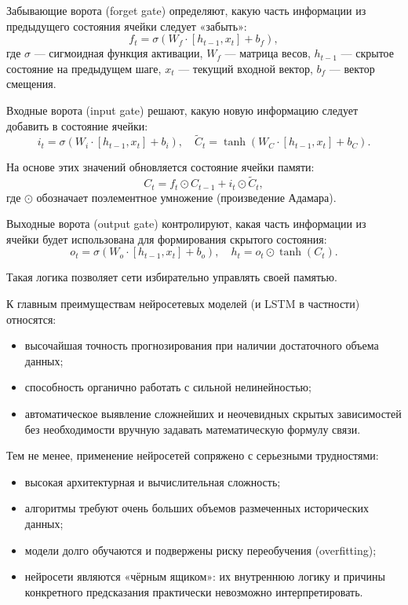 Забывающие ворота (forget gate) определяют, какую часть информации из предыдущего состояния ячейки следует «забыть»:
$$f_t = \sigma(W_f \cdot [h_{t-1}, x_t] + b_f),$$
где $\sigma$ — сигмоидная функция активации, $W_f$ — матрица весов, $h_{t-1}$ — скрытое состояние на предыдущем шаге, $x_t$ — текущий входной вектор, $b_f$ — вектор смещения.

Входные ворота (input gate) решают, какую новую информацию следует добавить в состояние ячейки:
$$i_t = \sigma(W_i \cdot [h_{t-1}, x_t] + b_i), \quad \tilde{C}_t = \tanh(W_C \cdot [h_{t-1}, x_t] + b_C).$$

На основе этих значений обновляется состояние ячейки памяти:
$$C_t = f_t \odot C_{t-1} + i_t \odot \tilde{C}_t,$$
где $\odot$ обозначает поэлементное умножение (произведение Адамара).

Выходные ворота (output gate) контролируют, какая часть информации из ячейки будет использована для формирования скрытого состояния:
$$o_t = \sigma(W_o \cdot [h_{t-1}, x_t] + b_o), \quad h_t = o_t \odot \tanh(C_t).$$

Такая логика позволяет сети избирательно управлять своей памятью.

К главным преимуществам нейросетевых моделей (и LSTM в частности) относятся:
\begin{itemize}
    \item высочайшая точность прогнозирования при наличии достаточного объема данных;
    \item способность органично работать с сильной нелинейностью;
    \item автоматическое выявление сложнейших и неочевидных скрытых зависимостей без необходимости вручную задавать математическую формулу связи.
\end{itemize}

Тем не менее, применение нейросетей сопряжено с серьезными трудностями:
\begin{itemize}
    \item высокая архитектурная и вычислительная сложность;
    \item алгоритмы требуют очень больших объемов размеченных исторических данных;
    \item модели долго обучаются и подвержены риску переобучения (overfitting);
    \item нейросети являются «чёрным ящиком»: их внутреннюю логику и причины конкретного предсказания практически невозможно интерпретировать.
\end{itemize}

